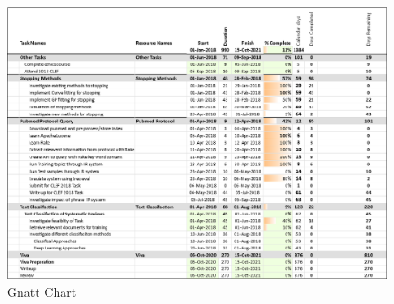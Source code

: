 \begin{figure}[H]
\center
\includegraphics[width=17cm]{figures/gnatt.png}
\caption{Gnatt Chart}
\end{figure}



